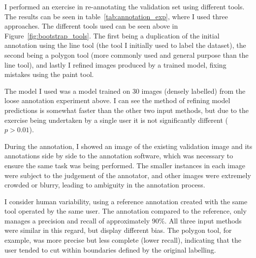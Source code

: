 I performed an exercise in re-annotating the validation set using different tools. The results can be seen in table~\ref{tab:annotation_exp}, where I used three approaches. The different tools used can be seen above in Figure~\ref{fig:bootstrap_tools}.  The first being a duplication of the initial annotation using the line tool (the tool I initially used to label the dataset), the second being a polygon tool (more commonly used and general purpose than the line tool), and lastly I refined images produced by a trained model, fixing mistakes using the paint tool.

The model I used was a model trained on 30 images (densely labelled) from the loose annotation experiment above. I can see the method of refining model predictions is somewhat faster than the other two input methods, but due to the exercise being undertaken by a single user it is not significantly different ($ p > 0.01 $).

During the annotation, I showed an image of the existing validation image and its annotations side by side to the annotation software, which was necessary to ensure the same task was being performed. The smaller instances in each image were subject to the judgement of the annotator, and other images were extremely crowded or blurry, leading to ambiguity in the annotation process. 

I consider human variability, using a reference annotation created with the same tool operated by the same user. The annotation compared to the reference, only manages a precision and recall of approximately $90\%$. All three input methods were similar in this regard, but display different bias. The polygon tool, for example, was more precise but less complete (lower recall), indicating that the user tended to cut within boundaries defined by the original labelling. 
 
